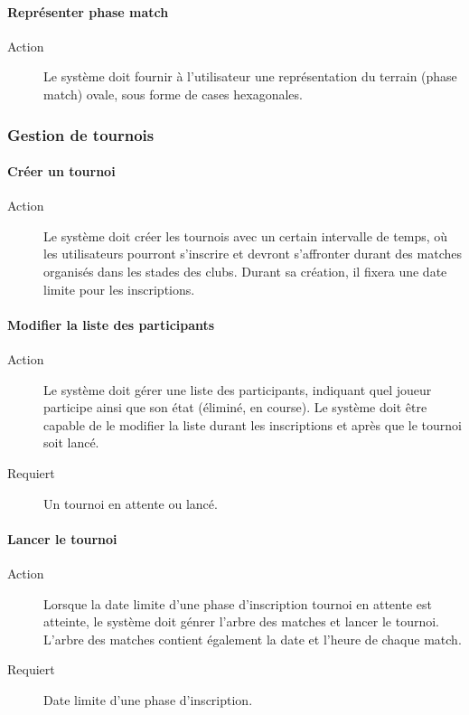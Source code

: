 \documentclass[a4paper]{article}
\begin{document}
\paragraph{Représenter phase match}
\begin{description}
\item[Action] Le système doit fournir à l'\gls{utilisateur} une représentation du terrain (phase match) ovale, sous forme de cases hexagonales.
\end{description}

\subsubsection{Gestion de tournois}
\paragraph{Créer un tournoi}
\begin{description}
\item[Action] Le système doit créer les tournois avec un certain intervalle de temps, où les \glspl{utilisateur} pourront s'inscrire et devront s'affronter durant des matches organisés dans les stades des \glspl{club}.
Durant sa création, il fixera une date limite pour les inscriptions.
\end{description}

\paragraph{Modifier la liste des participants}
\begin{description}
\item[Action] Le système doit gérer une liste des participants, indiquant quel joueur participe ainsi que son état (éliminé, en course). Le système doit être capable de le modifier la liste durant les inscriptions et après que le tournoi soit lancé.
\item[Requiert] Un tournoi en attente ou lancé.
\end{description}

\paragraph{Lancer le tournoi}
\begin{description}
\item[Action] Lorsque la date limite d'une phase d'inscription tournoi en attente est atteinte, le système doit génrer l'arbre des matches et lancer le tournoi. L'arbre des matches contient également la date et l'heure de chaque match.
\item[Requiert] Date limite d'une phase d'inscription.
\end{description}
\end{document}
